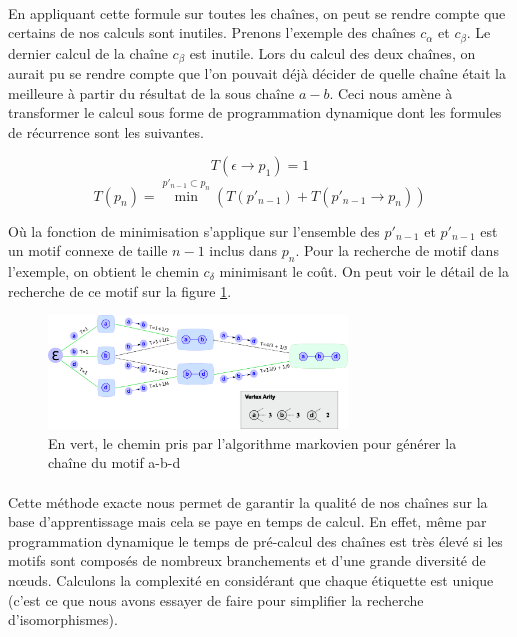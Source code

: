 \documentclass[12pt,french,twoside]{report}
\begin{document}
\paragraph{}En appliquant cette formule sur toutes les chaînes, on peut se rendre compte que certains de nos calculs sont inutiles.
Prenons l'exemple des chaînes $c_{\alpha}$ et $c_{\beta}$. Le dernier calcul de la chaîne $c_{\beta}$ est inutile. Lors
du calcul des deux chaînes, on aurait pu se rendre compte que l'on pouvait déjà décider de quelle chaîne était la meilleure à
partir du résultat de la sous chaîne $a-b$. Ceci nous amène à transformer le calcul sous forme de programmation dynamique dont les
formules de récurrence sont les suivantes.


\begin{equation}
 T(\epsilon \rightarrow p_1) = 1
\end{equation}
\begin{equation}
 T(p_n) = \min^{p'_{n-1} \subset p_n} (T(p'_{n-1}) + T(p'_{n-1} \rightarrow p_n))
\end{equation}

Où la fonction de minimisation s'applique sur l'ensemble des $p'_{n-1}$ et $p'_{n-1}$ est un motif connexe de taille $n-1$ inclus
dans $p_n$. Pour la recherche de motif dans l'exemple, on obtient le chemin $c_{\delta}$ minimisant le coût. On peut voir le
détail de la recherche de ce motif sur la figure \ref{markov}.

\begin{figure}
  \includegraphics[width=300px]{Figures/s2m/indexation/markov.png}
  \caption{\label{markov}En vert, le chemin pris par l'algorithme markovien pour générer la chaîne du motif a-b-d}
\end{figure}

\paragraph{}Cette méthode exacte nous permet de garantir la qualité de nos chaînes sur la base d'apprentissage mais cela se paye
en temps de calcul. En effet, même par programmation dynamique le temps de pré-calcul des chaînes est très élevé si les motifs sont
composés de nombreux branchements et d'une grande diversité de n\oe{}uds. Calculons la complexité en considérant que chaque 
étiquette est unique (c'est ce que nous avons essayer de faire pour simplifier la recherche d'isomorphismes).
\end{document}
